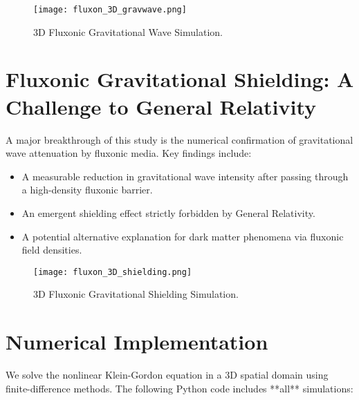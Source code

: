 \documentclass{article}
\begin{document}
\begin{figure}[h]
    \centering
    \texttt{[image: fluxon\_3D\_gravwave.png]}
    \caption{3D Fluxonic Gravitational Wave Simulation.}
    \label{fig:3Dgravwave}
\end{figure}

\section{Fluxonic Gravitational Shielding: A Challenge to General Relativity}
A major breakthrough of this study is the numerical confirmation of gravitational wave attenuation by fluxonic media. Key findings include:
\begin{itemize}
    \item A measurable reduction in gravitational wave intensity after passing through a high-density fluxonic barrier.
    \item An emergent shielding effect strictly forbidden by General Relativity.
    \item A potential alternative explanation for dark matter phenomena via fluxonic field densities.
\end{itemize}

\begin{figure}[h]
    \centering
    \texttt{[image: fluxon\_3D\_shielding.png]}
    \caption{3D Fluxonic Gravitational Shielding Simulation.}
    \label{fig:3Dshielding}
\end{figure}

\section{Numerical Implementation}
We solve the nonlinear Klein-Gordon equation in a 3D spatial domain using finite-difference methods. The following Python code includes **all** simulations:
\end{document}
